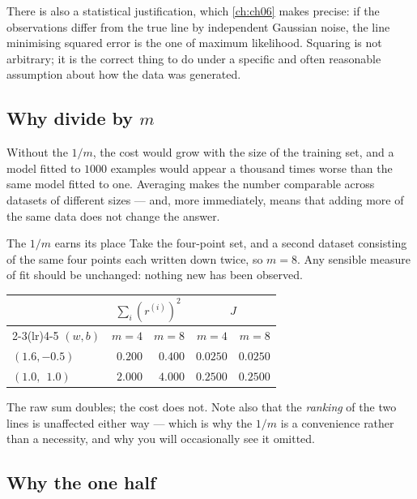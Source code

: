 There is also a statistical justification, which \cref{ch:ch06} makes precise:
if the observations differ from the true line by independent Gaussian noise,
the line minimising squared error is the one of maximum likelihood. Squaring is
not arbitrary; it is the correct thing to do under a specific and often
reasonable assumption about how the data was generated.

\subsection{Why divide by \texorpdfstring{$m$}{m}}

Without the $1/m$, the cost would grow with the size of the training set, and a
model fitted to $1000$ examples would appear a thousand times worse than the
same model fitted to one. Averaging makes the number comparable across datasets
of different sizes --- and, more immediately, means that adding more of the same
data does not change the answer.

\begin{workedexample}{The $1/m$ earns its place}
Take the four-point set, and a second dataset consisting of the same four points
each written down twice, so $m = 8$. Any sensible measure of fit should be
unchanged: nothing new has been observed.

\begin{center}
\small
\begin{tabular}{@{}lrrrr@{}}
\toprule
& \multicolumn{2}{c}{$\sum_i (r^{(i)})^2$} & \multicolumn{2}{c}{$J$}\\
\cmidrule(lr){2-3}\cmidrule(lr){4-5}
$(w,b)$ & $m=4$ & $m=8$ & $m=4$ & $m=8$\\
\midrule
$(1.6,-0.5)$ & $0.200$ & $0.400$ & $0.0250$ & $0.0250$\\
$(1.0,\ \ 1.0)$ & $2.000$ & $4.000$ & $0.2500$ & $0.2500$\\
\bottomrule
\end{tabular}
\end{center}

The raw sum doubles; the cost does not. Note also that the \emph{ranking} of the
two lines is unaffected either way --- which is why the $1/m$ is a convenience
rather than a necessity, and why you will occasionally see it omitted.
\end{workedexample}

\subsection{Why the one half}

